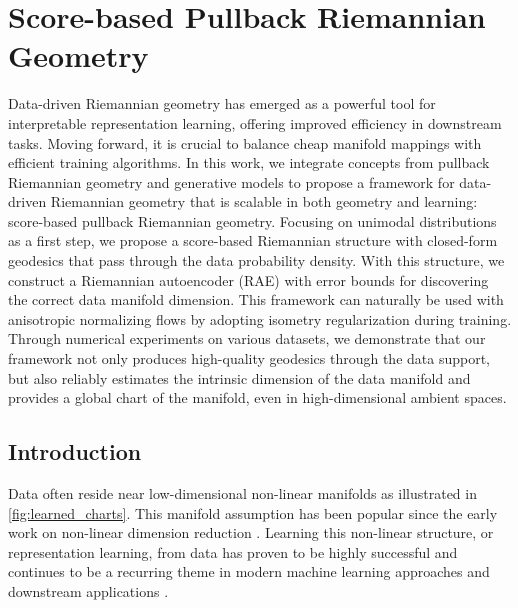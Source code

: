 
\chapter{Score-based Pullback Riemannian Geometry}\label{Chapter:Pullback-riemannian-geometry}

\ifpdf
    \graphicspath{{Chapter5/Figs/Raster/}{Chapter5/Figs/PDF/}{Chapter5/Figs/}}
\else
    \graphicspath{{Chapter5/Figs/Vector/}{Chapter5/Figs/}}
\fi

Data-driven Riemannian geometry has emerged as a powerful tool for interpretable representation learning, offering improved efficiency in downstream tasks. Moving forward, it is crucial to balance cheap manifold mappings with efficient training algorithms. In this work, we integrate concepts from pullback Riemannian geometry and generative models to propose a framework for data-driven Riemannian geometry that is scalable in both geometry and learning: score-based pullback Riemannian geometry. Focusing on unimodal distributions as a first step, we propose a score-based Riemannian structure with closed-form geodesics that pass through the data probability density. With this structure, we construct a Riemannian autoencoder (RAE) with error bounds for discovering the correct data manifold dimension. This framework can naturally be used with anisotropic normalizing flows by adopting isometry regularization during training. Through numerical experiments on various datasets, we demonstrate that our framework not only produces high-quality geodesics through the data support, but also reliably estimates the intrinsic dimension of the data manifold and provides a global chart of the manifold, even in high-dimensional ambient spaces.

\section{Introduction}

Data often reside near low-dimensional non-linear manifolds as illustrated in \ref{fig:learned_charts}. This manifold assumption \cite{fefferman2016testing} has been popular since the early work on non-linear dimension reduction \cite{belkin2001laplacian,coifman2006diffusion,roweis2000nonlinear,sammon1969nonlinear,tenenbaum2000global}. Learning this non-linear structure, or representation learning, from data has proven to be highly successful \cite{demers1992non,kingma2013auto} and continues to be a recurring theme in modern machine learning approaches and downstream applications \cite{chow2022predicting,gomari2022variational,ternes2022multi,vahdat2020nvae,zhong2021cryodrgn}. 

